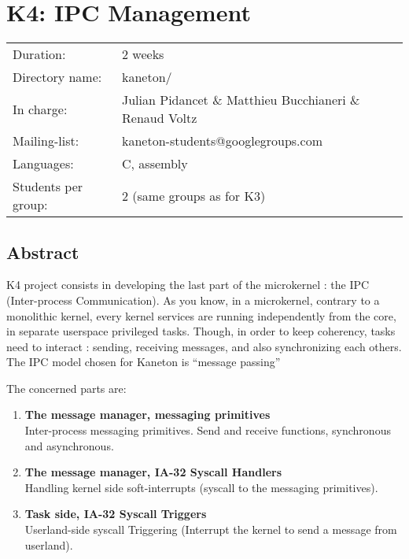 
%
%

\chapter{K4: IPC Management}

%
%

\begin{tabular}{p{7cm}l}
Duration: & 2 weeks \\
Directory name: & kaneton/ \\
In charge: & Julian Pidancet \& Matthieu Bucchianeri \& Renaud Voltz\\
Mailing-list: & kaneton-students@googlegroups.com \\
Languages: & C, assembly \\
Students per group: & 2 (same groups as for K3) \\
\end{tabular}

\section{Abstract}

K4 project consists in developing the last part of the microkernel : the
IPC (Inter-process Communication). As you know, in a microkernel, contrary
to a monolithic kernel, every kernel services are running independently
from the core, in separate userspace privileged tasks. Though, in order
to keep coherency, tasks need to interact : sending, receiving messages,
and also synchronizing each others. The IPC model chosen for Kaneton is
``message passing''

The concerned parts are:

\begin{enumerate}
  \item
    {\bf The message manager, messaging primitives}\\
    Inter-process messaging primitives. Send and receive functions,
    synchronous and asynchronous.
  \item
    {\bf The message manager, IA-32 Syscall Handlers}\\
    Handling kernel side soft-interrupts (syscall to the messaging primitives).
  \item
    {\bf Task side, IA-32 Syscall Triggers}\\
    Userland-side syscall Triggering (Interrupt the kernel to send a
    message from userland).

\end{enumerate}

